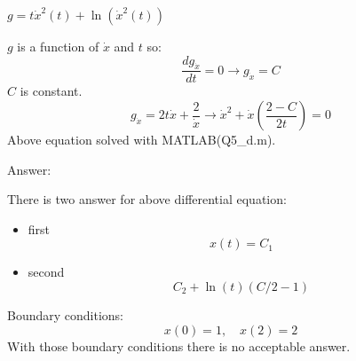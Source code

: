 $g = t\dot x^2 (t) + \ln(\dot x^2(t))$


$g$ is a function of $\dot x$ and $t$ so:
$$\dfrac{dg_{\dot x}}{dt} = 0 \to g_{\dot x} = C $$
$C$ is constant.
$$g_{\dot x} = 2t\dot x + \dfrac{2}{\dot x}\to  \dot x^2 + \dot x (\dfrac{2-C}{2t})=0$$
Above equation solved with MATLAB(Q5\_d.m).



Answer:


There is two answer for above differential equation:
\begin{itemize}
	\item first
	$$x(t) = C_1$$
	\item second
	$$C_2 + \ln(t)(C/2 - 1)$$
\end{itemize}

Boundary conditions:
$$x(0) = 1, \quad x(2) = 2$$
With those boundary conditions there is no acceptable answer.


